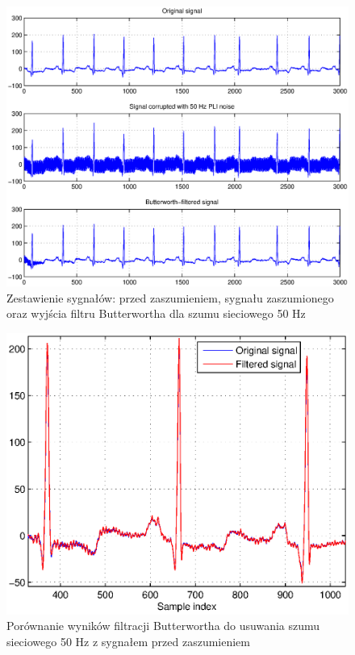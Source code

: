 \begin{figure}[H]
\centering
	\includegraphics[width=1.05\textwidth]{ECG_BASELINE/figures/50hz.eps}
\caption{Zestawienie sygnałów: przed zaszumieniem, sygnału zaszumionego oraz wyjścia filtru Butterwortha dla szumu sieciowego 50 Hz}
\label{fig:50hz_comparison}
\end{figure}

\begin{figure}[H]
\centering
	\includegraphics[width=\textwidth]{ECG_BASELINE/figures/50hz_zoom.eps}
\caption{Porównanie wyników filtracji Butterwortha do usuwania szumu sieciowego 50 Hz z sygnałem przed zaszumieniem}
\label{fig:50hz_zoom}
\end{figure}


